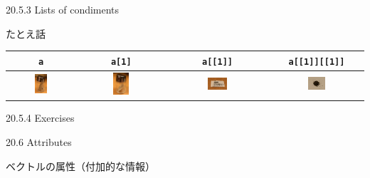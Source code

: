 \documentclass[ignorenonframetext,]{beamer}
\begin{document}
\begin{frame}[fragile]{20.5.3 Lists of condiments}

たとえ話

\begin{longtable}[]{@{}cccc@{}}
\toprule
\texttt{a} & \texttt{a{[}1{]}} & \texttt{a{[}{[}1{]}{]}} &
\texttt{a{[}{[}1{]}{]}{[}{[}1{]}{]}}\tabularnewline
\midrule
\endhead
\includegraphics[width=0.20000\textwidth]{../img/pepper.jpg} &
\includegraphics[width=0.20000\textwidth]{../img/pepper-1.jpg} &
\includegraphics[width=0.20000\textwidth]{../img/pepper-2.jpg} &
\includegraphics[width=0.20000\textwidth]{../img/pepper-3.jpg}\tabularnewline
\bottomrule
\end{longtable}

\end{frame}

\begin{frame}{20.5.4 Exercises}

\end{frame}

\begin{frame}{20.6 Attributes}

ベクトルの属性（付加的な情報）

\end{frame}
\end{document}
